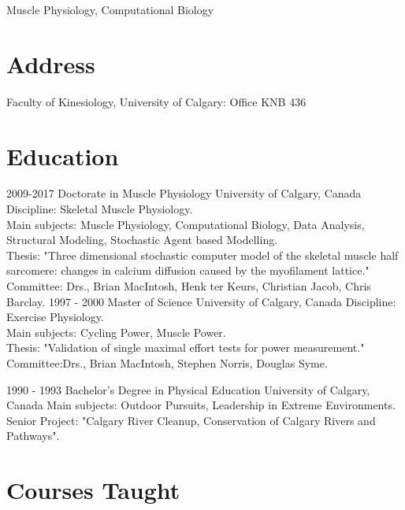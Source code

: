 \documentclass[]{friggeri-cv}
\begin{document}
      {Muscle Physiology, Computational Biology}
   


\section{Address}
  Faculty of Kinesiology, University of Calgary: Office KNB 436 %
    ~
\section{Education}
\begin{entrylist}
  \entry
    {2009-2017}
    {Doctorate in Muscle Physiology}
    {University of Calgary, Canada}
    {Discipline: Skeletal Muscle Physiology.\\
    Main subjects: Muscle Physiology, Computational Biology, Data Analysis, Structural Modeling, Stochastic Agent based Modelling.\\
    {Thesis:  "Three dimensional stochastic computer model of the skeletal muscle half sarcomere: changes in calcium diffusion caused by the myofilament lattice."}\\
    {Committee:} Drs., Brian MacIntosh, Henk ter Keurs, Christian Jacob,  Chris Barclay.}
  \entry
    {1997 - 2000}
    {Master of Science}
    {University of Calgary, Canada}
    {Discipline: Exercise Physiology.\\
    Main subjects: Cycling Power, Muscle Power.\\
     {Thesis:  "Validation of single maximal effort tests for power measurement."}\\
     {Committee:Drs., Brian MacIntosh, Stephen Norris, Douglas Syme.}}
  
  \entry
    {1990 - 1993}
    {Bachelor's Degree in Physical Education}
    {University of Calgary, Canada}
    {Main subjects: Outdoor Pursuits, Leadership in Extreme Environments.\\
    {Senior Project: "Calgary River Cleanup, Conservation of Calgary Rivers and Pathways".}}
 
\end{entrylist}
\section{Courses Taught}
\end{document}

